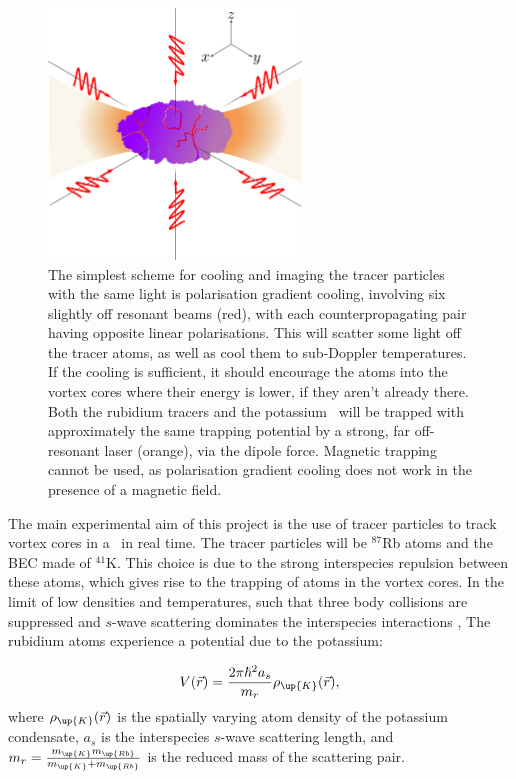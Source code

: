 \begin{figure}
\begin{center}
\includegraphics[width=0.6\textwidth]{figures/unsorted/setup.png}
\caption{\label{fig:setup}The simplest scheme for cooling and imaging the tracer particles with the same light is polarisation gradient cooling, involving six slightly off resonant beams (red), with each counterpropagating pair having opposite linear polarisations. This will scatter some light off the tracer atoms, as well as cool them to sub-Doppler temperatures. If the cooling is sufficient, it should encourage the atoms into the vortex cores where their energy is lower, if they aren't already there. Both the rubidium tracers and the potassium \bec\ will be trapped with approximately the same trapping potential by a strong, far off-resonant laser (orange), via the dipole force. Magnetic trapping cannot be used, as polarisation gradient cooling does not work in the presence of a magnetic field.}
\end{center}
\end{figure}

The main experimental aim of this project is the use of tracer particles to track vortex cores in a \bec\ in real time. The tracer particles will be $^{87}$Rb atoms and the BEC made of $^{41}$K. This choice is due to the strong interspecies repulsion between these atoms, which gives rise to the trapping of atoms in the vortex cores. In the limit of low densities and temperatures, such that three body collisions are suppressed and $s$-wave scattering dominates the interspecies interactions \cite[p 120]{leggett_quantum_2006}, The rubidium atoms experience a potential due to the potassium:

\begin{equation}
V(\vec{r}) = \frac{2\pi\hbar^2 a_s}{m_r}\rho_\up{K}(\vec{r}),
\end{equation}
where $\rho_\up{K}(\vec{r})$ is the spatially varying atom density of the potassium condensate, $a_s$ is the interspecies $s$-wave scattering length, and
$m_r = \frac{m_\up{K}m_\up{Rb}}{m_\up{K} + m_\up{Rb}}$ is the reduced mass of the scattering pair.

